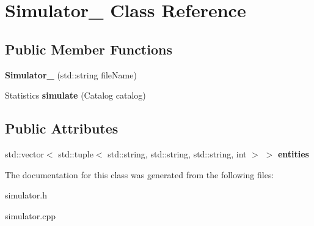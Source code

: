 \hypertarget{class_simulator__}{}\section{Simulator\+\_\+ Class Reference}
\label{class_simulator__}
\subsection*{Public Member Functions}
\begin{DoxyCompactItemize}
\item 
{\bfseries Simulator\+\_\+} (std\+::string file\+Name)\hypertarget{class_simulator___a14e1afe0c1f6717e4f4eef21419e84ec}{}\label{class_simulator___a14e1afe0c1f6717e4f4eef21419e84ec}

\item 
Statistics {\bfseries simulate} (Catalog catalog)\hypertarget{class_simulator___afb5e8918a23d039cfc31ab8abc921498}{}\label{class_simulator___afb5e8918a23d039cfc31ab8abc921498}

\end{DoxyCompactItemize}
\subsection*{Public Attributes}
\begin{DoxyCompactItemize}
\item 
std\+::vector$<$ std\+::tuple$<$ std\+::string, std\+::string, std\+::string, int $>$ $>$ {\bfseries entities}\hypertarget{class_simulator___ab8ffd354ca15eb30cd1f33ddfa1933c8}{}\label{class_simulator___ab8ffd354ca15eb30cd1f33ddfa1933c8}

\end{DoxyCompactItemize}


The documentation for this class was generated from the following files\+:\begin{DoxyCompactItemize}
\item 
simulator.\+h\item 
simulator.\+cpp\end{DoxyCompactItemize}

